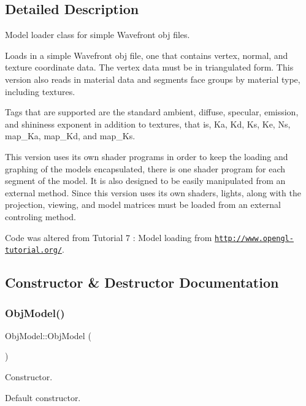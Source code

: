 \subsection{Detailed Description}
Model loader class for simple Wavefront obj files. 

Loads in a simple Wavefront obj file, one that contains vertex, normal, and texture coordinate data. The vertex data must be in triangulated form. This version also reads in material data and segments face groups by material type, including textures.

Tags that are supported are the standard ambient, diffuse, specular, emission, and shininess exponent in addition to textures, that is, Ka, Kd, Ks, Ke, Ns, map\+\_\+\+Ka, map\+\_\+\+Kd, and map\+\_\+\+Ks.

This version uses its own shader programs in order to keep the loading and graphing of the models encapsulated, there is one shader program for each segment of the model. It is also designed to be easily manipulated from an external method. Since this version uses its own shaders, lights, along with the projection, viewing, and model matrices must be loaded from an external controling method.

Code was altered from Tutorial 7 \+: Model loading from \href{http://www.opengl-tutorial.org/}{\tt http\+://www.\+opengl-\/tutorial.\+org/}. 

\subsection{Constructor \& Destructor Documentation}
\mbox{\label{class_obj_model_af7c00f757992e626f2dd959f4c829125}} 
\subsubsection{\texorpdfstring{Obj\+Model()}{ObjModel()}}
{\footnotesize\ttfamily Obj\+Model\+::\+Obj\+Model (\begin{DoxyParamCaption}{ }\end{DoxyParamCaption})}



Constructor. 

Default constructor. \mbox{\label{class_obj_model_a78d50e0da345b8b2438bbc93ae01eab8}} 

